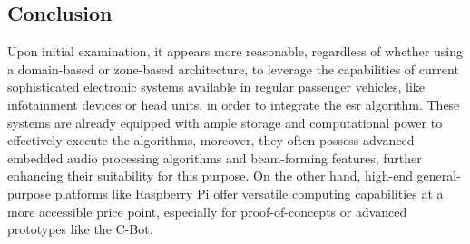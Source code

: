 \subsection{Conclusion}
\label{subsec:ECU_conclusion}

Upon initial examination, it appears more reasonable, regardless of whether using a domain-based or zone-based architecture, to leverage the capabilities of current sophisticated electronic systems available in regular passenger vehicles, like infotainment devices or head units, in order to integrate the \gls{esr} algorithm. These systems are already equipped with ample storage and computational power to effectively execute the algorithms, moreover, they often possess advanced embedded audio processing algorithms and beam-forming features, further enhancing their suitability for this purpose. On the other hand, high-end general-purpose platforms like Raspberry Pi offer versatile computing capabilities at a more accessible price point, especially for proof-of-concepts or advanced prototypes like the C-Bot.

